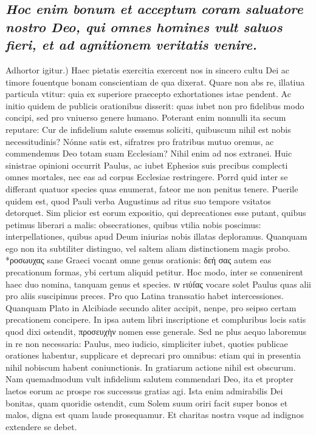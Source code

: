 \documentclass{article}
\begin{document}
\begin{pages}
\subsection*{\textit{ Hoc enim bonum et acceptum coram saluatore nostro Deo, qui omnes homines vult saluos fieri, et ad agnitionem veritatis venire. }}\pstart Adhortor igitur.) Haec pietatis exercitia exercent nos in sincero cultu Dei ac timore fouentque bonam conscientiam de qua dixerat. Quare non abs re, illatiua particula vtitur: quia ex superiore praecepto exhortationes istae pendent. Ac initio quidem de publicis orationibus disserit: quas iubet non pro fidelibus modo concipi, sed pro vniuerso genere humano. Poterant enim nonnulli ita secum reputare: Cur de infidelium salute essemus soliciti, quibuscum nihil est nobis necessitudinis? Nónne satis est, sifratres pro fratribus mutuo oremus, ac commendemus Deo totam suam Ecclesiam? Nihil enim ad nos extranei. Huic sinistrae opinioni occurrit Paulus, ac iubet Ephesios suis precibus complecti omnes mortales, nec eas ad corpus Ecclesiae restringere. Porrd quid inter se differant quatuor species quas enumerat, fateor me non penitus tenere. Puerile quidem est, quod Pauli verba Augustinus ad ritus suo tempore vsitatos detorquet. Sim plicior est eorum expositio, qui deprecationes esse putant, quibus petimus liberari a malis: obsecrationes, quibus vtilia nobis poscimus: interpellationes, quibus apud Deum iniurias nobis illatas deploramus. Quanquam ego non ita subtiliter distinguo, vel saltem aliam distinctionem magis probo. *ροσωυχας sane Graeci vocant omne genus orationis: δεή σας autem eas precationum formas, ybi certum aliquid petitur. Hoc modo, inter se conuenirent haec duo nomina, tanquam genus et species. ιν rιύfας vocare solet Paulus quas alii pro aliis suscipimus preces. Pro quo Latina transsatio habet intercessiones. Quanquam Plato in Alcibiade secundo aliter accipit, nenpe, pro seipso certam precationem concipere. In ipsa autem libri inscriptione et compluribus locis satis quod dixi ostendit, προσευχὴν nomen esse generale. Sed ne plus aequo laboremus in re non necessaria: Paulus, meo iudicio, simpliciter iubet, quoties publicae orationes habentur, supplicare et deprecari pro omnibus: etiam qui in presentia nihil nobiscum habent coniunctionis. In gratiarum actione nihil est obscurum. Nam quemadmodum vult infidelium salutem commendari Deo, ita et propter laetos eorum ac prospe ros successus gratias agi. Ista enim admirabilis Dei bonitas, quam quoridie ostendit, cum Solem suum oriri facit super bonos et malos, digna est quam laude prosequamur. Et charitas nostra vsque ad indignos extendere se debet.  \pend

\end{pages}
\end{document}
